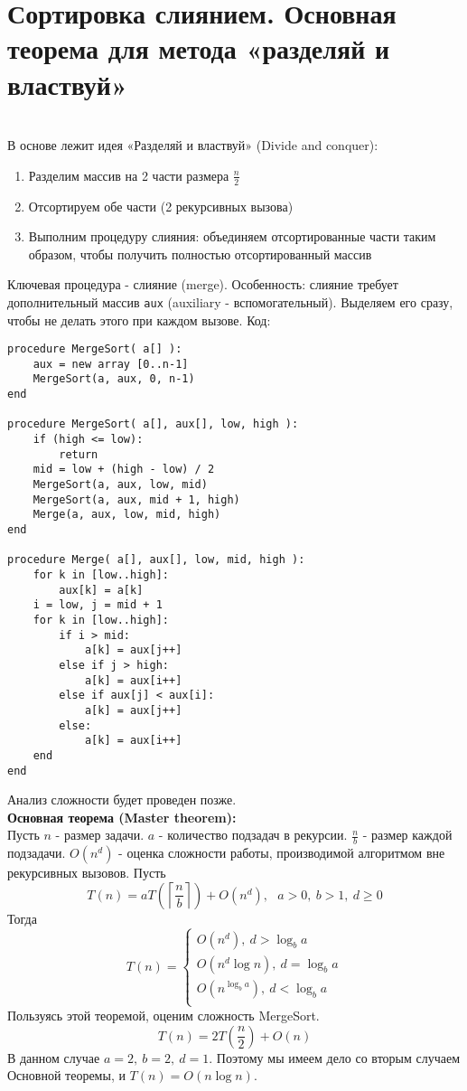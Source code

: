 
\section {Сортировка слиянием. Основная теорема для метода «разделяй и властвуй»}
\\
В основе лежит идея «Разделяй и властвуй» (Divide and conquer):
\begin{enumerate}
\item Разделим массив на 2 части размера $\frac{n}{2}$
\item Отсортируем обе части (2 рекурсивных вызова)
\item Выполним процедуру слияния: объединяем отсортированные части таким образом, чтобы
получить полностью отсортированный массив
\end{enumerate}
Ключевая процедура - слияние (merge). Особенность: слияние требует дополнительный массив
\texttt{aux} (auxiliary - вспомогательный). Выделяем его сразу, чтобы не делать этого при
каждом вызове.
Код:
\begin{verbatim}
procedure MergeSort( a[] ):
    aux = new array [0..n-1]
    MergeSort(a, aux, 0, n-1)
end

procedure MergeSort( a[], aux[], low, high ):
    if (high <= low):
        return
    mid = low + (high - low) / 2
    MergeSort(a, aux, low, mid)
    MergeSort(a, aux, mid + 1, high)
    Merge(a, aux, low, mid, high)
end

procedure Merge( a[], aux[], low, mid, high ):
    for k in [low..high]:
        aux[k] = a[k]
    i = low, j = mid + 1
    for k in [low..high]:
        if i > mid:
            a[k] = aux[j++]
        else if j > high:
            a[k] = aux[i++]
        else if aux[j] < aux[i]:
            a[k] = aux[j++]
        else:
            a[k] = aux[i++]
    end
end
\end{verbatim}
Анализ сложности будет проведен позже.\\
{\bf Основная теорема (Master theorem):}\\
Пусть $n$ - размер задачи. $a$ - количество подзадач в рекурсии. $\frac{n}{b}$ - размер каждой подзадачи. $O(n^d)$ - оценка сложности работы, производимой алгоритмом вне рекурсивных вызовов. Пусть
$$
T(n) = aT(\left\lceil\frac{n}{b}\right\rceil) + O(n^d),\ \ \ a>0,\ b>1,\ d\ge0
$$
Тогда
$$
T(n) = 
\begin{cases}
 O(n^d),\ d>\log_{b}a \\
 O(n^d\log n),\ d=\log_{b}a \\
 O(n^{\log_{b}a}),\ d<\log_{b}a \\
\end{cases}
$$
Пользуясь этой теоремой, оценим сложность MergeSort. 
$$
T(n) = 2T(\frac{n}{2}) + O(n)
$$ 
В данном случае $a = 2,\ b = 2,\ d = 1$. Поэтому мы имеем дело со вторым случаем Основной теоремы, и $T(n) = O(n\log n)$.
